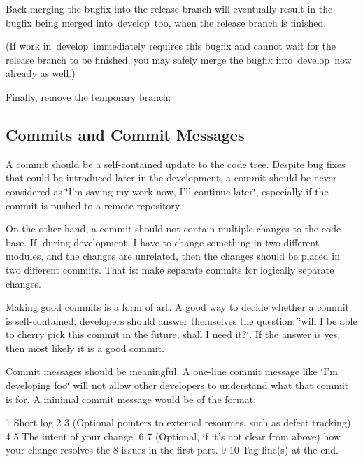Back-\/merging the bugfix into the release branch will eventually result in the bugfix being merged into {\ttfamily develop} too, when the release branch is finished.

(If work in develop immediately requires this bugfix and cannot wait for the release branch to be finished, you may safely merge the bugfix into {\ttfamily develop} now already as well.)

Finally, remove the temporary branch\+:




\subsection*{Commits and Commit Messages}

A commit should be a self-\/contained update to the code tree. Despite bug fixes that could be introduced later in the development, a commit should be never considered as \char`\"{}\+I’m saving my work now, I’ll continue later\char`\"{}, especially if the commit is pushed to a remote repository.

On the other hand, a commit should not contain multiple changes to the code base. If, during development, I have to change something in two different modules, and the changes are unrelated, then the changes should be placed in two different commits. That is\+: make separate commits for logically separate changes.

Making good commits is a form of art. A good way to decide whether a commit is self-\/contained, developers should answer themselves the question\+: \char`\"{}will I be able to cherry pick this commit in the future, shall I need it?\char`\"{}. If the answer is yes, then most likely it is a good commit.

Commit messages should be meaningful. A one-\/line commit message like \char`\"{}\+I’m developing foo\char`\"{} will not allow other developers to understand what that commit is for. A minimal commit message would be of the format\+:


\begin{DoxyCode}
1 Short log
2 
3 (Optional pointers to external resources, such as defect tracking)
4 
5 The intent of your change.
6 
7 (Optional, if it's not clear from above) how your change resolves the
8 issues in the first part.
9 
10 Tag line(s) at the end.   
\end{DoxyCode}


